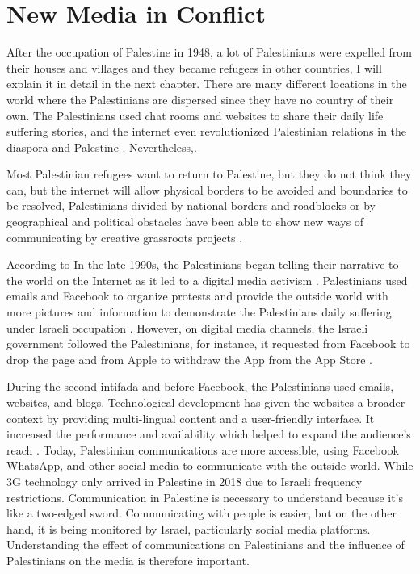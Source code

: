 \section{New Media in Conflict}

After the occupation of Palestine in 1948, a lot of Palestinians were expelled from their houses and villages and they became refugees in other countries, I will explain it in detail in the next chapter.  
There are many different locations in the world where the Palestinians are dispersed since they have no country of their own. The Palestinians used chat rooms and websites to share their daily life suffering stories, and the internet even revolutionized Palestinian relations in the diaspora and Palestine \citep{Ogunyemi2015, Aouragh2011}. Nevertheless,\cite [p.1]{Aouragh2011}.

Most Palestinian refugees want to return to Palestine, but they do not think they can, but the internet will allow physical borders to be avoided and boundaries to be resolved, Palestinians divided by national borders and roadblocks or by geographical and political obstacles have been able to show new ways of communicating by creative grassroots projects \citep{Aouragh2011}. 


According to \cite{Wulf2013} In the late 1990s, the Palestinians began telling their narrative to the world on the Internet as it led to a digital media activism \citep{Wulf2013}. Palestinians used emails and Facebook to organize protests and provide the outside world with more pictures and information to demonstrate the Palestinians daily suffering under Israeli occupation \citep{Wulf2013}. However, on digital media channels, the Israeli government followed the Palestinians, for instance, it requested from Facebook to drop the page  and from Apple to withdraw the  App from the App Store \citep{Wulf2013}. 

During the second intifada and before Facebook, the Palestinians used emails, websites, and blogs. Technological development has given the websites a broader context by providing multi-lingual content and a user-friendly interface. It increased the performance and availability which helped to expand the audience's reach \citep{Aouragh2011}. Today, Palestinian communications are more accessible, using Facebook WhatsApp, and other social media to communicate with the outside world. While 3G technology only arrived in Palestine in 2018 due to Israeli frequency restrictions. Communication in Palestine is necessary to understand because it's like a two-edged sword. Communicating with people is easier, but on the other hand, it is being monitored by Israel, particularly social media platforms.  Understanding the effect of communications on Palestinians and the influence of Palestinians on the media is therefore important.

